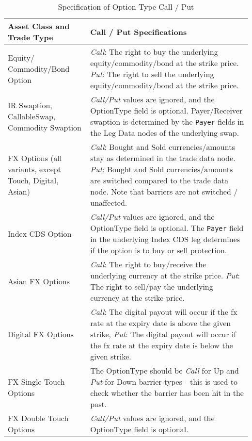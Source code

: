 \begin{itemize}
\begin{table}[H]
\centering
\begin{tabular} {|p{6cm}|p{8cm}|}
    \hline
      \bfseries{Asset Class and Trade Type}  & \bfseries{Call / Put Specifications} \\  \hline
Equity/ Commodity/Bond Option & \emph{Call}: The right to buy the underlying equity/commodity/bond at the strike price.
\newline \emph{Put}: The right to sell the underlying equity/commodity/bond at the strike price. \\  \hline
 IR Swaption, CallableSwap, Commodity Swaption&  \emph{Call/Put} values are ignored, and the OptionType field is optional. Payer/Receiver swaption is determined by the  \lstinline!Payer! fields in the Leg Data nodes of the underlying swap. \\ \hline
FX Options (all variants, except Touch, Digital, Asian) &  \emph{Call}: Bought and Sold currencies/amounts stay as determined in the trade data node. 
\newline \emph{Put}: Bought and Sold currencies/amounts are switched compared to the trade data node. Note that barriers are not switched / unaffected. \\ \hline
Index CDS Option &  \emph{Call/Put} values are ignored, and the OptionType field is optional. The \lstinline!Payer! field in the underlying Index CDS leg  determines if the option is to buy or sell protection. \\ \hline
Asian FX Options &  \emph{Call}: The right to buy/receive the underlying currency at the strike price.  \newline \emph{Put}: The right to sell/pay  the underlying currency at the strike price.   \\ \hline
Digital FX Options &  \emph{Call}: The digital payout will occur if the fx rate at the expiry date is above the given
strike, \newline \emph{Put}: The digital payout will occur if the fx rate at the expiry date is below the given strike.   \\ \hline
FX Single Touch Options &  The OptionType should be \emph{Call} for Up and \emph{Put} for Down barrier types - this is used to check whether the barrier has been hit in the past.   \\ \hline
FX Double Touch Options &  \emph{Call/Put} values are ignored, and the OptionType field is optional.  \\ \hline

  \end{tabular}
  \caption{Specification of Option Type Call / Put}
  \label{tab:callput_specs}
\end{table}


\end{itemize}
